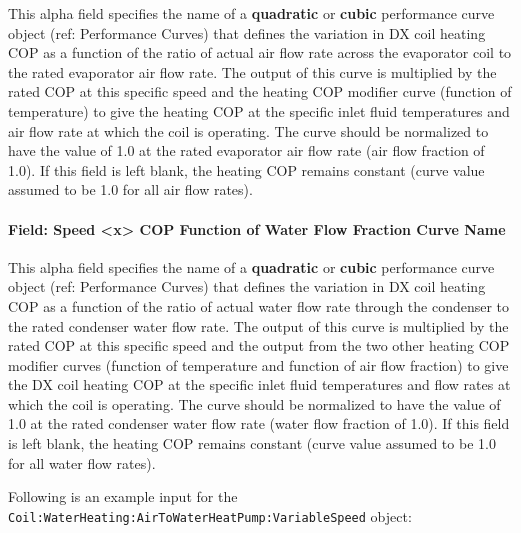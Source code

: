 This alpha field specifies the name of a \textbf{quadratic} or \textbf{cubic} performance curve object (ref: Performance Curves) that defines the variation in DX coil heating COP as a function of the ratio of actual air flow rate across the evaporator coil to the rated evaporator air flow rate.
The output of this curve is multiplied by the rated COP at this specific speed and the heating COP modifier curve (function of temperature) to give the heating COP at the specific inlet fluid temperatures and air flow rate at which the coil is operating. The curve should be normalized to have the value of 1.0 at the rated evaporator air flow rate (air flow fraction of 1.0). If this field is left blank, the heating COP remains constant (curve value assumed to be 1.0 for all air flow rates).


\paragraph{Field: Speed \textless{}x\textgreater{} COP Function of Water Flow Fraction Curve Name}\label{vshpwhheating-speed-x-cop-function-of-water-flow-fraction-curve-name}

This alpha field specifies the name of a \textbf{quadratic} or \textbf{cubic} performance curve object (ref: Performance Curves) that defines the variation in DX coil heating COP as a function of the ratio of actual water flow rate through the condenser to the rated condenser water flow rate.
The output of this curve is multiplied by the rated COP at this specific speed and the output from the two other heating COP modifier curves (function of temperature and function of air flow fraction) to give the DX coil heating COP at the specific inlet fluid temperatures and flow rates at which the coil is operating. The curve should be normalized to have the value of 1.0 at the rated condenser water flow rate (water flow fraction of 1.0). If this field is left blank, the heating COP remains constant (curve value assumed to be 1.0 for all water flow rates).

Following is an example input for the \lstinline!Coil:WaterHeating:AirToWaterHeatPump:VariableSpeed! object:

